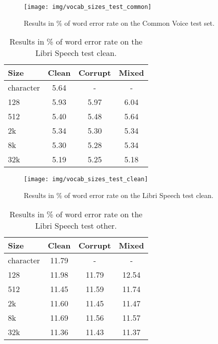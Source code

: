 \begin{figure}[p]
	\centering
	\texttt{[image: img/vocab\_sizes\_test\_common]}
	\caption{Results in \% of word error rate on the Common Voice test set.}
	\label{fig:vocab_sizes_common_graph}
\end{figure}


\begin{table}[p]
	\centering
	\begin{tabular}{l|ccc}
		\bf Size & \bf Clean & \bf Corrupt & \bf Mixed \\
		\hline
		
		character    &    5.64    &    -    &    - \\
		128    &    5.93    &    5.97    &    6.04 \\
		512    &    5.40    &    5.48    &    5.64 \\
		2k    &    5.34    &    5.30    &    5.34 \\
		8k    &    5.30    &    5.28    &    5.34 \\
		32k    &    5.19    &    5.25    &    5.18 \\
		
	\end{tabular}
	
	\caption{Results in \% of word error rate on the Libri Speech test clean.}
	\label{tab:results_vocabularies_libri_clean}
\end{table}

\begin{figure}[p]
	\centering
	\texttt{[image: img/vocab\_sizes\_test\_clean]}
	\caption{Results in \% of word error rate on the Libri Speech test clean.}
	\label{fig:vocab_sizes_test_clean}
\end{figure}

\begin{table}[p]
	\centering
	\begin{tabular}{l|ccc}
		\bf Size & \bf Clean & \bf Corrupt & \bf Mixed \\
		\hline
		character    &    11.79    &    -    &    - \\
		128    &    11.98    &    11.79    &    12.54\\
		512    &    11.45    &    11.59    &    11.74\\
		2k    &    11.60    &    11.45    &    11.47\\
		8k    &    11.69    &    11.56    &    11.57\\
		32k    &    11.36    &    11.43    &    11.37\\
		
	\end{tabular}
	
	\caption{Results in \% of word error rate on the Libri Speech test other.}
	\label{tab:results_vocabularies_libri_other}
\end{table}

